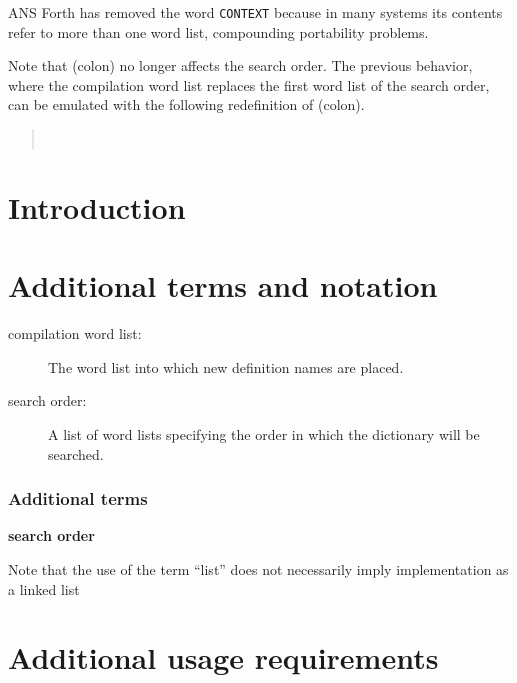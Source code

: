 \begin{info}
ANS Forth has removed the word \texttt{CONTEXT} because in many systems
its contents refer to more than one word list, compounding portability
problems.

Note that \word{:} (colon) no longer affects the search order. The
previous behavior, where the compilation word list replaces the first
word list of the search order, can be emulated with the following
redefinition of \word{:} (colon).

\begin{quote}\ttfamily
	\word{:} \word{:}   
		~  ~
		  \word{:}
	\word{;}
\end{quote}
\end{info}

\section{Introduction} %

\section{Additional terms and notation} %

\begin{description}
\item[compilation word list:]
	The word list into which new definition names are placed.

\item[search order:]
	A list of word lists specifying the order in which the
	dictionary will be searched.
\end{description}

\begin{info}
\subsubsection{Additional terms} %

\textbf{search order}

Note that the use of the term ``list'' does not necessarily imply
implementation as a linked list

\end{info}

\section{Additional usage requirements} %

